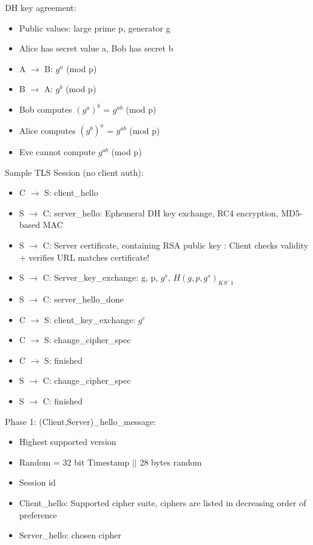\documentclass[fs, footer]{latex4ei}
\begin{document}
\begin{multicols*}{4}
DH key agreement:
\begin{itemize}
	
    \item Public	values:	large	prime	p,	generator	g
    \item Alice	has	secret	value	a,	Bob	has	secret	b
    \item A	$\rightarrow$ B:	$g^a$	(mod	p)	
    \item B	$\rightarrow$ A:	$g^b$  (mod	p)	
    \item Bob computes	$(g^a)^b$	=	$g^{ab}$	(mod	p)	
    \item Alice	computes $(g^b)^a$	=	$g^{ab}$	(mod	p)
	\item Eve	cannot	compute	$g^{ab}$	(mod	p)	
\end{itemize}

Sample TLS Session (no client auth):
\begin{itemize}
	\item C $\rightarrow$ S:  client\_hello
	\item S $\rightarrow$ C:  server\_hello: Ephemeral DH  key exchange,   RC4 encryption,  MD5-based   MAC 
	\item S $\rightarrow$ C:  Server  certificate, containing  RSA public  key : Client checks  validity + verifies URL matches certificate! 
	\item S $\rightarrow$ C:  Server\_key\_exchange: g, p, $g^s$, ${H(g, p, g^s)}_{KS^-1}$  
	\item S $\rightarrow$ C:  server\_hello\_done
	\item C $\rightarrow$ S:  client\_key\_exchange: $g^c$
	\item C $\rightarrow$ S:  change\_cipher\_spec
	\item C $\rightarrow$ S:  finished    
	\item S $\rightarrow$ C:  change\_cipher\_spec
	\item S $\rightarrow$ C:  finished
\end{itemize}

Phase 1: (Client,Server)\_hello\_message:
\begin{itemize}
	\item Highest   supported   version 
	\item Random    =   32  bit Timestamp  $||$  28  bytes   random  
	\item Session   id  
	\item Client\_hello: Supported   cipher  suite,  ciphers are listed  
	in  decreasing  order   of  preference  
	\item Server\_hello: chosen  cipher  
\end{itemize}
 

\end{multicols*}
\end{document}

